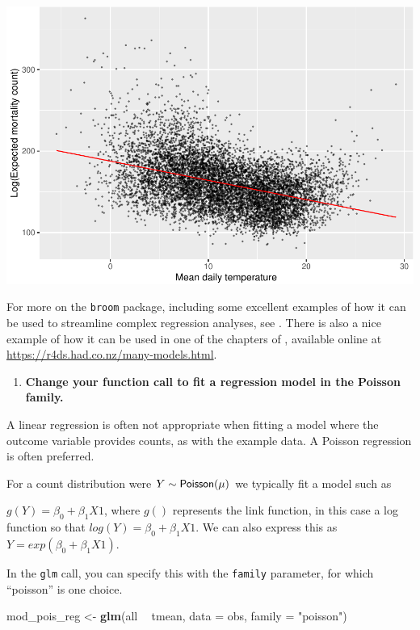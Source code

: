 \documentclass[
]{book}
\newenvironment{Shaded}{\begin{snugshade}}{\end{snugshade}}
\newcommand{\DataTypeTok}[1]{\textcolor[rgb]{0.13,0.29,0.53}{#1}}
\newcommand{\KeywordTok}[1]{\textcolor[rgb]{0.13,0.29,0.53}{\textbf{#1}}}
\newcommand{\NormalTok}[1]{#1}
\newcommand{\OperatorTok}[1]{\textcolor[rgb]{0.81,0.36,0.00}{\textbf{#1}}}
\newcommand{\StringTok}[1]{\textcolor[rgb]{0.31,0.60,0.02}{#1}}
\providecommand{\tightlist}{%
  \setlength{\itemsep}{0pt}\setlength{\parskip}{0pt}}
\begin{document}
\includegraphics{adv_epi_analysis_files/figure-latex/unnamed-chunk-27-1.pdf}

For more on the \texttt{broom} package, including some excellent examples of how it
can be used to streamline complex regression analyses, see \citet{robinson2014broom}.
There is also a nice example of how it can be used in one of the chapters of
\citet{wickham2016r}, available online at \url{https://r4ds.had.co.nz/many-models.html}.

\begin{enumerate}
\def\labelenumi{\arabic{enumi}.}
\setcounter{enumi}{1}
\tightlist
\item
  \textbf{Change your function call to fit a regression model in the Poisson family.}
\end{enumerate}

A linear regression is often not appropriate when fitting a model where the
outcome variable provides counts, as with the example data. A Poisson regression
is often preferred.

For a count distribution were \(Y \sim {\sf Poisson(\mu)}\) we typically fit a model
such as

\(g(Y)=\beta_{0}+\beta_{1}X1\), where \(g()\) represents the link function, in this
case a log function so that \(log(Y)=\beta_{0}+\beta_{1}X1\). We can also express
this as \(Y=exp(\beta_{0}+\beta_{1}X1)\).

In the \texttt{glm} call, you can specify this with the \texttt{family}
parameter, for which ``poisson'' is one choice.

\begin{Shaded}
\begin{Highlighting}[]
\NormalTok{mod_pois_reg <-}\StringTok{ }\KeywordTok{glm}\NormalTok{(all }\OperatorTok{~}\StringTok{ }\NormalTok{tmean, }\DataTypeTok{data =}\NormalTok{ obs, }\DataTypeTok{family =} \StringTok{"poisson"}\NormalTok{)}
\end{Highlighting}
\end{Shaded}
\end{document}
